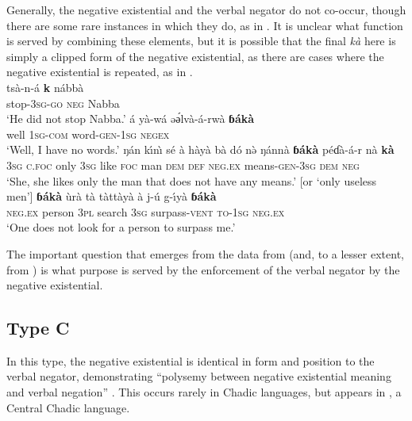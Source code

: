 \documentclass[output=paper]{langsci/langscibook}
\begin{document}
Generally, the negative existential and the verbal negator do not co-occur, though there are some rare instances in which they do, as in . It is unclear what function is served by combining these elements, but it is possible that the final \textit{kà} here is simply a clipped form of the negative existential, as there are cases where the negative existential is repeated, as in .
\ea\label{ex:wandala-stop-words-means-surpass}
\\ 
\ea\label{ex:wandala-stop}
\gll ts\`a-n-\'a \textbf{k} n\'abb\`a\\ 
stop-3\textsc{sg-go} \textsc{neg} Nabba\\ 
\glt `He did not stop Nabba.' 
\ex\label{ex:wandala-words}
\gll \'a y\`a-w\'a ə\'әlv\`a-\'a-rw\`a \textbf{ɓ\'ak\`a}\\
well 1\textsc{sg-com} word-\textsc{gen-1sg} \textsc{negex}\\
\glt `Well, I have no words.'
\ex\label{ex:wandala-means}
\gll ŋ\'an k{\'\i}n{\`\i} s\'e \`a h\`ay\`a b\`a d\'o n\`ə ŋ\'ann\`a \textbf{ɓ\'ak\`a} p\'eɗ\`a-\'a-r n\`a \textbf{k\`a}\\
3\textsc{sg} \textsc{c.foc} only 3\textsc{sg} like \textsc{foc} man \textsc{dem} \textsc{def} \textsc{neg.ex} means-\textsc{gen-3sg} \textsc{dem} \textsc{neg}\\
\glt `She, she likes only the man that does not have any means.' [or `only useless men']
\ex\label{ex:wandala-surpass}
\gll \textbf{ɓ\'ak\`a} \`ur\`a t\`a t\`att\`ay\`a \`a j-\'u g-{\'\i}y\`a \textbf{ɓ\'ak\`a}\\
\textsc{neg.ex} person 3\textsc{pl} search 3\textsc{sg} surpass-\textsc{vent} \textsc{to-1sg} \textsc{neg.ex}\\
\glt `One does not look for a person to surpass me.'
\z\z

The important question that emerges from the data from  (and, to a lesser extent, from ) is what purpose is served by the enforcement of the verbal negator by the negative existential.

\subsection{Type C}\label{sec:3:3.5}

In this type, the negative existential is identical in form and position to the verbal negator, demonstrating ``polysemy between negative existential meaning and verbal negation'' \citep[12]{Croft1991}. This occurs rarely in Chadic languages, but appears in , a Central Chadic language. 
\end{document}
